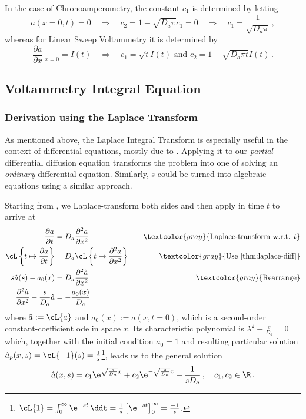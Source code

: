 \documentclass{prettytex/ox/mmsc-special-topic}
\begin{document}
  In the case of \underline{Chronoamperometry}, the constant $c_1$ is determined by letting
  $$a(x=0, t) = 0 \quad\Rightarrow\quad c_2 = 1 - \sqrt{D_a\pi} c_1 = 0 \quad\Rightarrow\quad c_1 = \frac{1}{\sqrt{D_a \pi}}\,,$$
  whereas for \underline{Linear Sweep Voltammetry} it is determined by
  $$\frac{\partial a}{\partial x}\bigg|_{x=0} = I(t) \quad\Rightarrow\quad c_1 = \sqrt{t} I(t) \text{ and } c_2 = 1 - \sqrt{D_a \pi t} I(t)\,.$$


  \subsection{Voltammetry Integral Equation}
  \subsubsection{Derivation using the Laplace Transform}
  As mentioned above, the Laplace Integral Transform is especially useful in the context of differential equations, mostly due to .
  Applying it to our \textit{partial} differential diffusion equation  transforms the problem into one of solving an \textit{ordinary} differential equation.
  Similarly, s could be turned into algebraic equations using a similar approach.

  Starting from , we Laplace-transform both sides and then apply  in time $t$ to arrive at
  \begin{align*}
    \frac{\partial a}{\partial t}                                   & = D_a \frac{\partial^2 a}{\partial x^2} \quad                             & \textcolor{gray}{\text{Laplace-transform w.r.t. } t} \\
    \cL\left\{t \mapsto \frac{\partial a}{\partial t}\right\}       & = D_a \cL\left\{t \mapsto \frac{\partial^2 a}{\partial x^2}\right\} \quad & \textcolor{gray}{\text{Use \Cref{thm:laplace-diff}}} \\
    s \hat{a}(s) - a_0(x)                                           & = D_a \frac{\partial^2 \hat{a}}{\partial x^2} \quad                       & \textcolor{gray}{\text{Rearrange}}                   \\
    \frac{\partial^2 \hat{a}}{\partial x^2} - \frac{s}{D_a} \hat{a} & = -\frac{a_0(x)}{D_a}
  \end{align*}
  where $\hat{a} := \cL\{a\}$ and $a_0(x) := a(x, t=0)$, which is a second-order constant-coefficient \glsdesc{ode} in space $x$. Its characteristic polynomial is $\lambda^2 + \frac{s}{D_a} = 0$ which, together with the initial condition $a_0 = 1$ and resulting particular solution $\hat{a}_p(x, s) = \cL\{-1\}(s) = \frac{1}{s}$\footnote{$\cL\{1\} = \int_{0}^{\infty} \e^{-st} \,\ddt = \frac{1}{s} \left[\e^{-st}\right]_0^\infty = \frac{-1}{s}$.}, leads us to the general solution
  \begin{equation}
    \hat{a}(x, s) = c_1 \e^{\sqrt{\frac{s}{D_a}}x} + c_2 \e^{-\sqrt{\frac{s}{D_a}}x} + \frac{1}{s D_a}\,,\quad c_1, c_2 \in \R\,.
    \label{eq:laplace-pre-solution}
  \end{equation}
\end{document}

